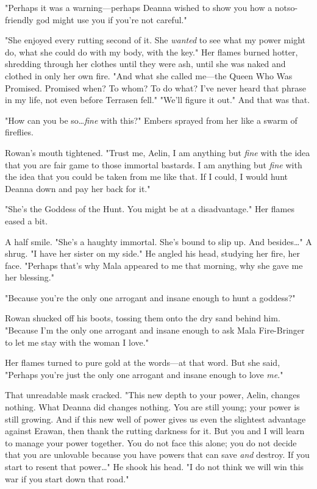 "Perhaps it was a warning---perhaps Deanna wished to show you how a notso-friendly god might use you if you're not careful."

"She enjoyed every rutting second of it.
She \emph{wanted} to see what my power might do, what she could do with my body, with the key."
Her flames burned hotter, shredding through her clothes until they were ash, until she was naked and clothed in only her own fire.
"And what she called me---the Queen Who Was Promised.
Promised when?
To whom?
To do what?
I've never heard that phrase in my life, not even before Terrasen fell."
"We'll figure it out."
And that was that.

"How can you be so\ldots \emph{fine} with this?"
Embers sprayed from her like a swarm of fireflies.

Rowan's mouth tightened.
"Trust me, Aelin, I am anything but \emph{fine} with the idea that you are fair game to those immortal bastards.
I am anything but \emph{fine} with the idea that you could be taken from me like that.
If I could, I would hunt Deanna down and pay her back for it."

"She's the Goddess of the Hunt.
You might be at a disadvantage."
Her flames eased a bit.

A half smile.
"She's a haughty immortal.
She's bound to slip up.
And besides\ldots " A shrug.
"I have her sister on my side."
He angled his head, studying her fire, her face.
"Perhaps that's why Mala appeared to me that morning, why she gave me her blessing."

"Because you're the only one arrogant and insane enough to hunt a goddess?"

Rowan shucked off his boots, tossing them onto the dry sand behind him.
"Because I'm the only one arrogant and insane enough to ask Mala Fire-Bringer to let me stay with the woman I love."

Her flames turned to pure gold at the words---at that word.
But she said, "Perhaps you're just the only one arrogant and insane enough to love \emph{me}."

That unreadable mask cracked.
"This new depth to your power, Aelin, changes nothing.
What Deanna did changes nothing.
You are still young;
your power is still growing.
And if this new well of power gives us even the slightest advantage against Erawan, then thank the rutting darkness for it.
But you and I will learn to manage your power together.
You do not face this alone; you do not decide that you are unlovable because you have powers that can save \emph{and} destroy.
If you start to resent that power\ldots" He shook his head.
"I do not think we will win this war if you start down that road."

